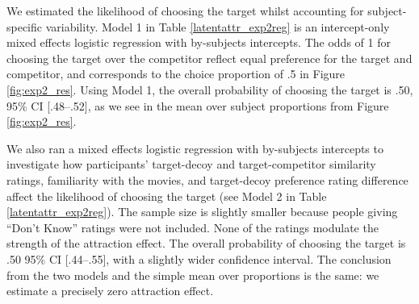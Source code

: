 \documentclass[12pt, a4paper]{article}
\begin{document}
We estimated the likelihood of choosing the target whilst accounting for subject-specific variability. Model 1 in Table \ref{latentattr_exp2reg} is an intercept-only mixed effects logistic regression with by-subjects intercepts. The odds of 1 for choosing the target over the competitor reflect equal preference for the target and competitor, and corresponds to the choice proportion of .5 in Figure \ref{fig:exp2_res}. Using Model 1, the overall probability of choosing the target is .50, 95\% CI [.48--.52], as we see in the mean over subject proportions from Figure \ref{fig:exp2_res}.

We also ran a mixed effects logistic regression with by-subjects intercepts to investigate how participants' target-decoy and target-competitor similarity ratings, familiarity with the movies, and target-decoy preference rating difference affect the likelihood of choosing the target (see Model 2 in Table \ref{latentattr_exp2reg}). The sample size is slightly smaller because people giving ``Don't Know'' ratings were not included. None of the ratings modulate the strength of the attraction effect. The overall probability of choosing the target is .50 95\% CI [.44--.55], with a slightly wider confidence interval. The conclusion from the two models and the simple mean over proportions is the same: we estimate a precisely zero attraction effect.
\end{document}
